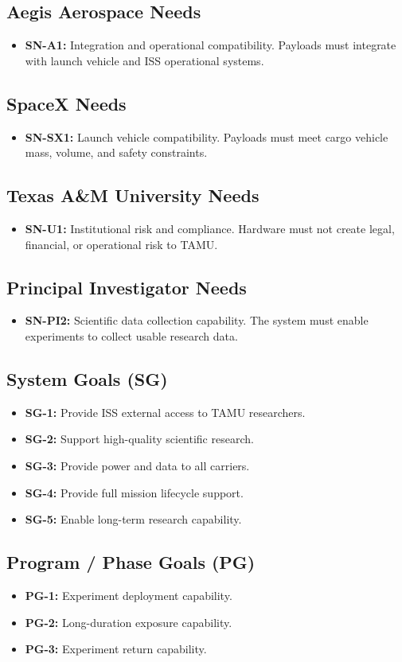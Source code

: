 \documentclass[conf]{new-aiaa}
\begin{document}
\subsection*{Aegis Aerospace Needs}
\begin{itemize}[leftmargin=*]
    \item \textbf{SN-A1:} Integration and operational compatibility. Payloads must integrate with launch vehicle and ISS operational systems.
\end{itemize}

\subsection*{SpaceX Needs}
\begin{itemize}[leftmargin=*]
    \item \textbf{SN-SX1:} Launch vehicle compatibility. Payloads must meet cargo vehicle mass, volume, and safety constraints.
\end{itemize}

\subsection*{Texas A\&M University Needs}
\begin{itemize}[leftmargin=*]
    \item \textbf{SN-U1:} Institutional risk and compliance. Hardware must not create legal, financial, or operational risk to TAMU.
\end{itemize}

\subsection*{Principal Investigator Needs}
\begin{itemize}[leftmargin=*]
    \item \textbf{SN-PI2:} Scientific data collection capability. The system must enable experiments to collect usable research data.
\end{itemize}

\subsection*{System Goals (SG)}
\begin{itemize}[leftmargin=*]
    \item \textbf{SG-1:} Provide ISS external access to TAMU researchers.
    \item \textbf{SG-2:} Support high-quality scientific research.
    \item \textbf{SG-3:} Provide power and data to all carriers.
    \item \textbf{SG-4:} Provide full mission lifecycle support.
    \item \textbf{SG-5:} Enable long-term research capability.
\end{itemize}

\subsection*{Program / Phase Goals (PG)}
\begin{itemize}[leftmargin=*]
    \item \textbf{PG-1:} Experiment deployment capability.
    \item \textbf{PG-2:} Long-duration exposure capability.
    \item \textbf{PG-3:} Experiment return capability.
\end{itemize}
\end{document}
